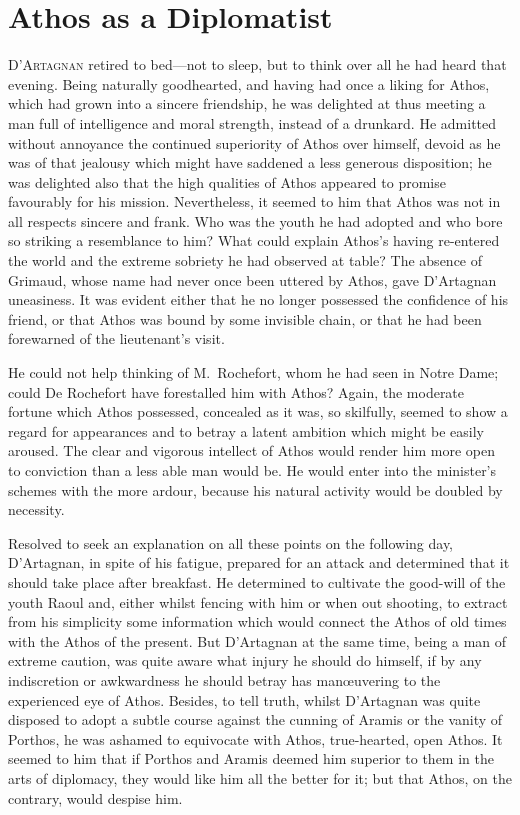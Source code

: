 \chapter{Athos as a Diplomatist}

 \lettrine{D}{'Artagnan} retired to bed—not to sleep, but to think over all he had heard that evening. Being naturally goodhearted, and having had once a liking for Athos, which had grown into a sincere friendship, he was delighted at thus meeting a man full of intelligence and moral strength, instead of a drunkard. He admitted without annoyance the continued superiority of Athos over himself, devoid as he was of that jealousy which might have saddened a less generous disposition; he was delighted also that the high qualities of Athos appeared to promise favourably for his mission. Nevertheless, it seemed to him that Athos was not in all respects sincere and frank. Who was the youth he had adopted and who bore so striking a resemblance to him? What could explain Athos's having re-entered the world and the extreme sobriety he had observed at table? The absence of Grimaud, whose name had never once been uttered by Athos, gave D'Artagnan uneasiness. It was evident either that he no longer possessed the confidence of his friend, or that Athos was bound by some invisible chain, or that he had been forewarned of the lieutenant's visit.

He could not help thinking of M.~Rochefort, whom he had seen in Notre Dame; could De Rochefort have forestalled him with Athos? Again, the moderate fortune which Athos possessed, concealed as it was, so skilfully, seemed to show a regard for appearances and to betray a latent ambition which might be easily aroused. The clear and vigorous intellect of Athos would render him more open to conviction than a less able man would be. He would enter into the minister's schemes with the more ardour, because his natural activity would be doubled by necessity.

Resolved to seek an explanation on all these points on the following day, D'Artagnan, in spite of his fatigue, prepared for an attack and determined that it should take place after breakfast. He determined to cultivate the good-will of the youth Raoul and, either whilst fencing with him or when out shooting, to extract from his simplicity some information which would connect the Athos of old times with the Athos of the present. But D'Artagnan at the same time, being a man of extreme caution, was quite aware what injury he should do himself, if by any indiscretion or awkwardness he should betray has manœuvering to the experienced eye of Athos. Besides, to tell truth, whilst D'Artagnan was quite disposed to adopt a subtle course against the cunning of Aramis or the vanity of Porthos, he was ashamed to equivocate with Athos, true-hearted, open Athos. It seemed to him that if Porthos and Aramis deemed him superior to them in the arts of diplomacy, they would like him all the better for it; but that Athos, on the contrary, would despise him.

